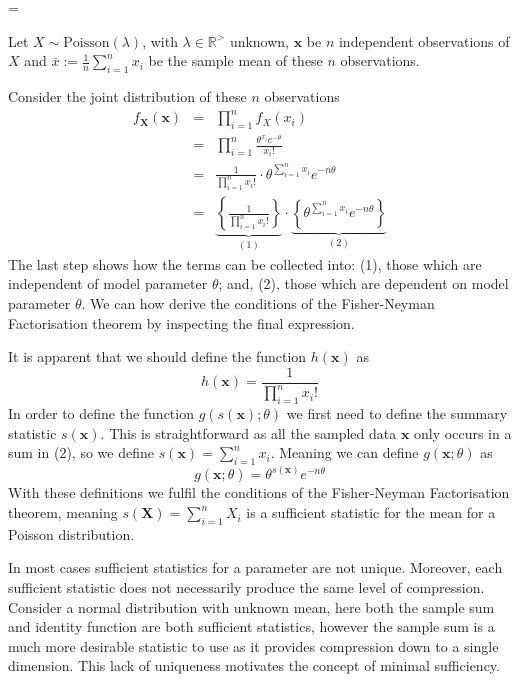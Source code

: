 \documentclass[bibliography=totoc,11pt,a4paper,margin=0]{article}
\theoremstyle{break}
\begin{document}
  \begin{box_example}\label{example_sufficient_stats_poisson}
    \everymath={\displaystyle}
    \par\par Let $X\sim\text{Poisson}(\lambda)$, with $\lambda\in\mathbb{R}^{>}$ unknown, $\mathbf{x}$ be $n$ independent observations of $X$ and $\textstyle\bar{x}:=\frac1n\sum_{i=1}^nx_i$ be the sample mean of these $n$ observations.
    \par Consider the joint distribution of these $n$ observations
    \[\begin{array}{rcl}
      f_{\mathbf{X}}(\mathbf{x})&=&\prod_{i=1}^nf_X(x_i)\\
      &=&\prod_{i=1}^n\frac{\theta^{x_i}e^{-\theta}}{x_i!}\\
      &=&\frac{1}{\prod_{i=1}^nx_i!}\cdot\theta^{\sum_{i=1}^nx_i}e^{-n\theta}\\
      &=&\underbrace{\left\{\frac{1}{\prod_{i=1}^nx_i!}\right\}}_{(1)}\cdot\underbrace{\left\{\theta^{\sum_{i=1}^nx_i}e^{-n\theta}\right\}}_{(2)}
    \end{array}\]
    The last step shows how the terms can be collected into: (1), those which are independent of model parameter $\theta$; and, (2), those which are dependent on model parameter $\theta$. We can how derive the conditions of the Fisher-Neyman Factorisation theorem by inspecting the final expression.
    \par It is apparent that we should define the function $h(\mathbf{x})$ as
    \[ h(\mathbf{x})=\frac1{\prod_{i=1}^nx_i!} \]
    In order to define the function $g(s(\mathbf{x});\theta)$ we first need to define the summary statistic $s(\mathbf{x})$. This is straightforward as all the sampled data $\mathbf{x}$ only occurs in a sum in (2), so we define $\textstyle s(\mathbf{x})=\sum_{i=1}^n x_i$. Meaning we can define $g(\mathbf{x};\theta)$ as
    \[ g(\mathbf{x};\theta)=\theta^{s(\mathbf{x})}e^{-n\theta} \]
    With these definitions we fulfil the conditions of the Fisher-Neyman Factorisation theorem, meaning $s(\mathbf{X})=\sum_{i=1}^nX_i$ is a sufficient statistic for the mean for a Poisson distribution.
  \end{box_example}

  \par In most cases sufficient statistics for a parameter are not unique. Moreover, each sufficient statistic does not necessarily produce the same level of compression. Consider a normal distribution with unknown mean, here both the sample sum and identity function are both sufficient statistics, however the sample sum is a much more desirable statistic to use as it provides compression down to a single dimension. This lack of uniqueness motivates the concept of minimal sufficiency.
\end{document}
